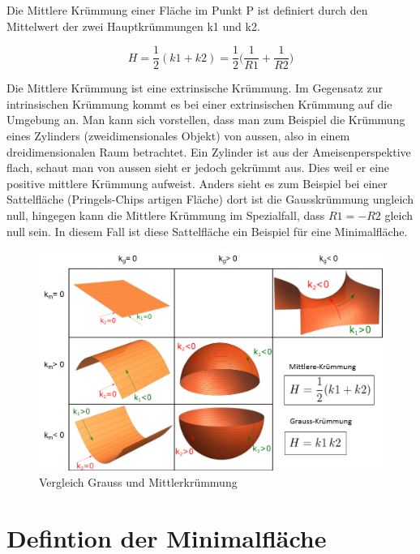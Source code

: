 \begin{refsection}

Die Mittlere Krümmung einer Fläche im Punkt P ist definiert durch den Mittelwert der zwei Hauptkrümmungen k1 und k2.

\begin{equation} \label{Mittlere Kruemmung_D}
  H=\frac{1}{2}(k1+k2)= \frac{1}{2}\bigg(\frac{1}{R1}+\frac{1}{R2}\bigg)
\end{equation}

Die Mittlere Krümmung ist eine extrinsische Krümmung. 
Im Gegensatz zur intrinsischen Krümmung kommt es bei einer extrinsischen Krümmung auf die Umgebung an. 
Man kann sich vorstellen, dass man zum Beispiel die Krümmung eines Zylinders (zweidimensionales Objekt) von aussen, also in einem dreidimensionalen Raum betrachtet. 
Ein Zylinder ist aus der Ameisenperspektive flach, schaut man von aussen sieht er jedoch gekrümmt aus.
Dies weil er eine positive mittlere Krümmung aufweist. 
Anders sieht es zum Beispiel bei einer Sattelfläche (Pringels-Chips artigen Fläche) dort ist die Gausskrümmung ungleich null, hingegen kann die Mittlere Krümmung im Spezialfall, dass $R1=-R2$ gleich null sein. In diesem Fall ist diese Sattelfläche ein Beispiel für eine Minimalfläche.

\begin{figure} [H]
  \centering
  \includegraphics[scale=0.4]{minimal/Tabelle_Kruemmung.png}
  \caption{Vergleich Grauss und Mittlerkrümmung} 
\end{figure}




\section{Defintion der Minimalfläche}


\end{refsection}
